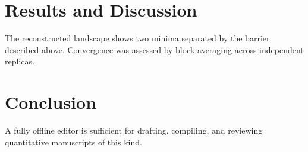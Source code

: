 \documentclass[11pt]{article}
\begin{document}
\section{Results and Discussion}
\label{sec:results}
The reconstructed landscape shows two minima separated by the barrier described above.
Convergence was assessed by block averaging across independent replicas.

\section{Conclusion}
\label{sec:conclusion}
A fully offline editor is sufficient for drafting, compiling, and reviewing quantitative
manuscripts of this kind.



\end{document}
